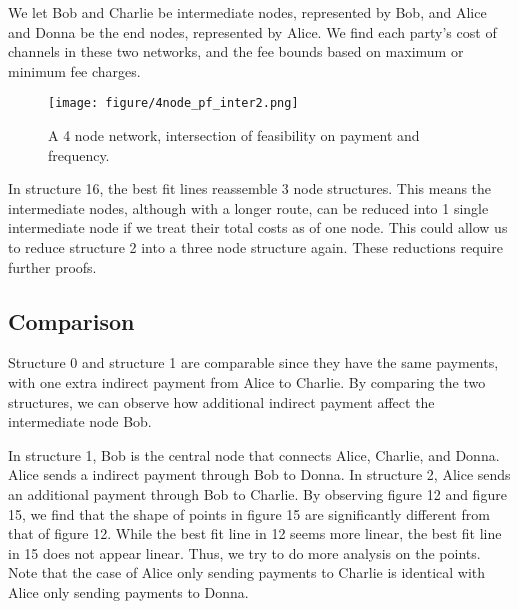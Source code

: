 \documentclass[twocolumn,10pt]{report}
\begin{document}
We let Bob and Charlie be intermediate nodes, represented by Bob, and Alice and Donna be the end nodes, represented by Alice. We find each party's cost of channels in these two networks, and the fee bounds based on maximum or minimum fee charges. 


\begin{figure}[t]
    \begin{center}
    \setlength{\unitlength}{0.012500in}%
    \texttt{[image: figure/4node\_pf\_inter2.png]}
    \end{center}
    \caption{A 4 node network, intersection of feasibility on payment and frequency.}
    \label{figure_4Node9} 
    \end{figure}

In structure 16, the best fit lines reassemble 3 node structures. This means the intermediate nodes, although with a longer route, can be reduced into 1 single intermediate node if we treat their total costs as of one node. This could allow us to reduce structure 2 into a three node structure again. These reductions require further proofs. 

\subsection{Comparison}

Structure 0 and structure 1 are comparable since they have the same payments, with one extra indirect payment from Alice to Charlie. By comparing the two structures, we can observe how additional indirect payment affect the intermediate node Bob. 

In structure 1, Bob is the central node that connects Alice, Charlie, and Donna. Alice sends a indirect payment through Bob to Donna. In structure 2, Alice sends an additional payment through Bob to Charlie. By observing figure 12 and figure 15, we find that the shape of points in figure 15 are significantly different from that of figure 12. While the best fit line in 12 seems more linear, the best fit line in 15 does not appear linear. Thus, we try to do more analysis on the points. Note that the case of Alice only sending payments to Charlie is identical with Alice only sending payments to Donna. 
\end{document}
